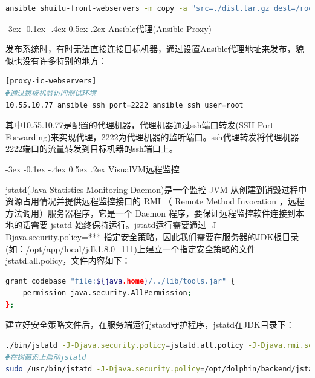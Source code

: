 \documentclass[12pt]{book}
\makeatletter
\numberwithin{dummy}{section}
\theoremstyle{ocrenumbox}
\theoremstyle{blacknumex}
\theoremstyle{blacknumbox}
\theoremstyle{ocrenum}
\renewcommand{\subsection}{\@startsection {subsection}{2}{\z@}
	{-3ex \@plus -0.1ex \@minus -.4ex}
	{0.5ex \@plus.2ex }
	{\normalfont\sffamily\bfseries}}
\makeatother
\begin{document}
\begin{lstlisting}[language=bash]
ansible shuitu-front-webservers -m copy -a "src=./dist.tar.gz dest=/root/app-soft/"
\end{lstlisting}

\subsection{Ansible代理(Ansible Proxy)}

发布系统时，有时无法直接连接目标机器，通过设置Ansible代理地址来发布，貌似也没有许多特别的地方：

\begin{lstlisting}[language=bash]
[proxy-ic-webservers]
#通过跳板机器访问测试环境
10.55.10.77 ansible_ssh_port=2222 ansible_ssh_user=root
\end{lstlisting}

其中10.55.10.77是配置的代理机器，代理机器通过ssh端口转发(SSH Port Forwarding)来实现代理，2222为代理机器的监听端口。ssh代理转发将代理机器2222端口的流量转发到目标机器的ssh端口上。



\subsection{VisualVM远程监控}

jstatd(Java Statistics Monitoring Daemon)是一个监控 JVM 从创建到销毁过程中资源占用情况并提供远程监控接口的 RMI （ Remote Method Invocation ，远程方法调用）服务器程序，它是一个 Daemon 程序，要保证远程监控软件连接到本地的话需要 jstatd 始终保持运行。jstatd运行需要通过 -J-Djava.security.policy=*** 指定安全策略，因此我们需要在服务器的JDK根目录(如：/opt/app/local/jdk1.8.0\_111)上建立一个指定安全策略的文件jstatd.all.policy，文件内容如下：

\begin{lstlisting}[language=Bash]
grant codebase "file:${java.home}/../lib/tools.jar" {  
	permission java.security.AllPermission;  
}; 
\end{lstlisting}


建立好安全策略文件后，在服务端运行jstatd守护程序，jstatd在JDK目录下：

\begin{lstlisting}[language=Bash]
./bin/jstatd -J-Djava.security.policy=jstatd.all.policy -J-Djava.rmi.server.hostname=10.10.1.12 -J-Djava.rmi.server.logCalls=true -p 1011
#在树莓派上启动jstatd
sudo /usr/bin/jstatd -J-Djava.security.policy=/opt/dolphin/backend/jstatd.all.policy -J-Djava.rmi.server.hostname=192.168.31.25 -J-Djava.rmi.server.logCalls=true -p 1011
\end{lstlisting}
\end{document}
